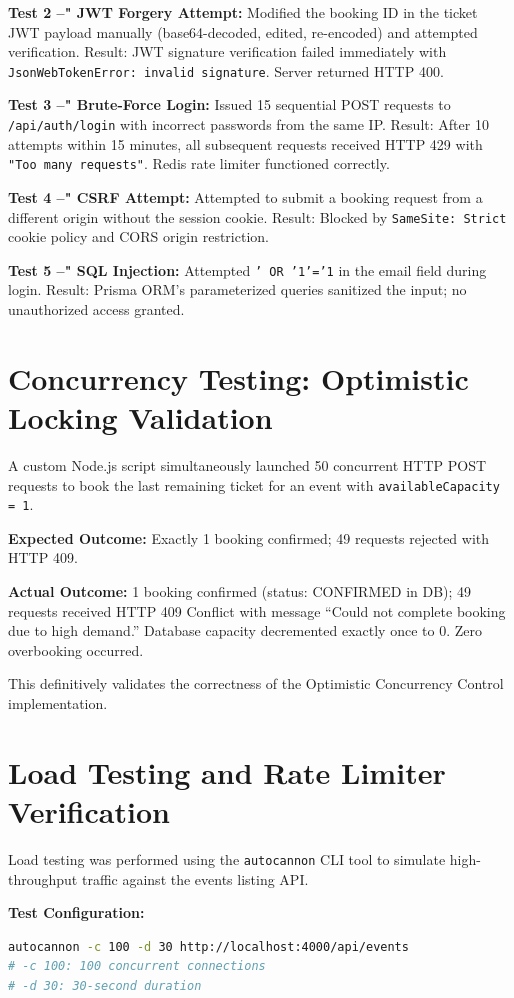 \documentclass[12pt,a4paper]{report}
\begin{document}
\textbf{Test 2 --" JWT Forgery Attempt:}
Modified the booking ID in the ticket JWT payload manually (base64-decoded, edited, re-encoded) and attempted verification. Result: JWT signature verification failed immediately with \texttt{JsonWebTokenError: invalid signature}. Server returned HTTP 400.

\textbf{Test 3 --" Brute-Force Login:}
Issued 15 sequential POST requests to \texttt{/api/auth/login} with incorrect passwords from the same IP. Result: After 10 attempts within 15 minutes, all subsequent requests received HTTP 429 with \texttt{"Too many requests"}. Redis rate limiter functioned correctly.

\textbf{Test 4 --" CSRF Attempt:}
Attempted to submit a booking request from a different origin without the session cookie. Result: Blocked by \texttt{SameSite: Strict} cookie policy and CORS origin restriction.

\textbf{Test 5 --" SQL Injection:}
Attempted \texttt{' OR '1'='1} in the email field during login. Result: Prisma ORM's parameterized queries sanitized the input; no unauthorized access granted.

\section{Concurrency Testing: Optimistic Locking Validation}
A custom Node.js script simultaneously launched 50 concurrent HTTP POST requests to book the last remaining ticket for an event with \texttt{availableCapacity = 1}.

\textbf{Expected Outcome:} Exactly 1 booking confirmed; 49 requests rejected with HTTP 409.

\textbf{Actual Outcome:} 1 booking confirmed (status: CONFIRMED in DB); 49 requests received HTTP 409 Conflict with message ``Could not complete booking due to high demand.'' Database capacity decremented exactly once to 0. Zero overbooking occurred.

This definitively validates the correctness of the Optimistic Concurrency Control implementation.

\section{Load Testing and Rate Limiter Verification}
Load testing was performed using the \texttt{autocannon} CLI tool to simulate high-throughput traffic against the events listing API.

\textbf{Test Configuration:}
\begin{lstlisting}[language=bash, caption=Autocannon Load Test Command]
autocannon -c 100 -d 30 http://localhost:4000/api/events
# -c 100: 100 concurrent connections
# -d 30: 30-second duration
\end{lstlisting}
\end{document}
